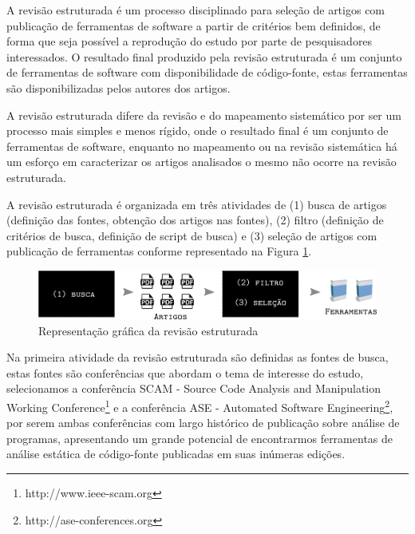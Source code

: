  \label{revisao-estruturada}


A revisão estruturada é um processo disciplinado para seleção de artigos com
publicação de ferramentas de software a partir de critérios bem definidos, de
forma que seja possível a reprodução do estudo por parte de pesquisadores
interessados. O resultado final produzido pela revisão estruturada é um conjunto
de ferramentas de software com disponibilidade de código-fonte, estas ferramentas
são disponibilizadas pelos autores dos artigos.

A revisão estruturada difere da revisão e do mapeamento sistemático
por ser um processo mais simples e menos rígido, onde o resultado final é
um conjunto de ferramentas de software, enquanto no mapeamento ou na revisão
sistemática há um esforço em caracterizar os artigos analisados o mesmo
não ocorre na revisão estruturada.

A revisão estruturada é organizada em três atividades de (1) busca de artigos
(definição das fontes, obtenção dos artigos nas fontes), (2) filtro (definição
de critérios de busca, definição de script de busca) e (3) seleção de artigos
com publicação de ferramentas conforme representado na Figura
\ref{figura-revisao-estruturada}.

\begin{figure}[h]
  \center
  \includegraphics[scale=0.33]{imagens/revisao-estruturada.png}
  \caption{Representação gráfica da revisão estruturada}
  \label{figura-revisao-estruturada}
\end{figure}

Na primeira atividade da revisão estruturada são definidas as fontes de busca, estas fontes
são conferências que abordam o tema de interesse do estudo, selecionamos a
conferência SCAM - Source Code Analysis and Manipulation Working
Conference\footnote{http://www.ieee-scam.org} e a conferência ASE - Automated
Software Engineering\footnote{http://ase-conferences.org}, por serem ambas conferências com largo
histórico de publicação sobre análise de programas, apresentando um grande
potencial de encontrarmos ferramentas de análise estática de código-fonte
publicadas em suas inúmeras edições.

